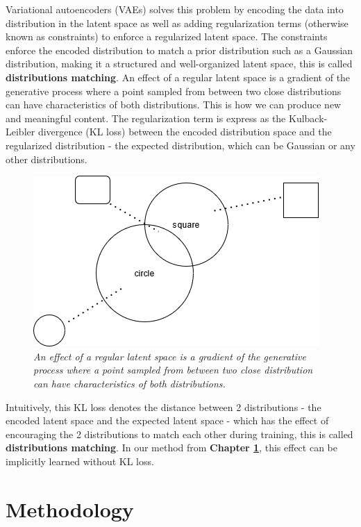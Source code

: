 \documentclass[12pt]{report}
\begin{document}
Variational autoencoders (VAEs) solves this problem by encoding the data into distribution in the latent space as well as adding regularization terms (otherwise known as constraints) to enforce a regularized latent space. The constraints enforce the encoded distribution to match a prior distribution such as a Gaussian distribution, making it a structured and well-organized latent space, this is called \textbf{distributions matching}. An effect of a regular latent space is a gradient of the generative process where a point sampled from between two close distributions can have characteristics of both distributions. This is how we can produce new and meaningful content. The regularization term is express as the Kulback-Leibler divergence (KL loss) \cite{kl-divergence} between the encoded distribution space and the regularized distribution - the expected distribution, which can be Gaussian or any other distributions.

\begin{figure}[H]
	\centering
	\includegraphics[scale=0.9]{distribution-space}
	\caption{\textit{An effect of a regular latent space is a gradient of the generative process where a point sampled from between two close distribution can have characteristics of both distributions.}}
	\label{fig:distribution-space}
\end{figure}

Intuitively, this KL loss denotes the distance between 2 distributions - the encoded latent space and the expected latent space - which has the effect of encouraging the 2 distributions to match each other during training, this is called \textbf{distributions matching}. In our method from \textbf{Chapter \ref{chap:methodology}}, this effect can be implicitly learned without KL loss.

\chapter{Methodology}
\label{chap:methodology}
\end{document}
